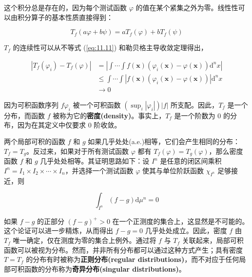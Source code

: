 这个积分总是存在的，因为每个测试函数 $\varphi$
的值在某个紧集之外为零。线性性可以由积分算子的基本性质直接得到：

$$
T_f(a \varphi + b \psi) = a T_f(\varphi) + b T_f(\psi)
$$

$T_f$ 的连续性可以从不等式 (\ref{eq:11.11}) 和勒贝格主导收敛定理得出，

$$
\begin{aligned}
\left|T_f(\varphi_i) - T_f(\varphi)\right| &= \left|\int \cdots \int f(\mathbf{x})\left(\varphi_i(\mathbf{x}) - \varphi(\mathbf{x})\right) \mathrm{d}^n x\right| \\
&\leq \int \cdots \int \left|f(\mathbf{x})\left(\varphi_i(\mathbf{x}) - \varphi(\mathbf{x})\right)\right| \mathrm{d}^n x \\
&\to 0
\end{aligned}
$$

因为可积函数序列 $f \varphi_i$ 被一个可积函数
$\left(\sup_i |\varphi_i|\right)|f|$ 所支配。因此，$T_f$
是一个分布，而函数 $f$
被称为它的\textbf{密度(density)}。事实上，$T_f$ 是一个阶数为 0
的分布，因为在其定义中仅要求 0 阶收敛。

两个局部可积的函数 $f$ 和 $g$
如果几乎处处(a.e.)相等，它们会产生相同的分布：$T_f = T_g$。反过来，如果对于所有测试函数
$\varphi$ 都有 $T_f(\varphi) = T_g(\varphi)$，那么密度函数 $f$ 和
$g$ 几乎处处相等。其证明思路如下：设 $I^n$ 是任意的闭区间乘积
$I^n = I_1 \times I_2 \times \cdots \times I_n$，并选择一个测试函数
$\varphi$ 使其与单位阶跃函数 $\chi_{I^n}$ 足够接近，则

$$
\int_{I^n}(f - g) \mathrm{d}\mu^n = 0
$$

如果 $f - g$ 的正部分 $(f - g)^+ > 0$
在一个正测度的集合上，这显然是不可能的。这个论证可以进一步精炼，从而得出
$f - g = 0$ 几乎处处成立。因此，密度 $f$ 由 $T_f$
唯一确定，仅在测度为零的集合上例外。通过将 $f$ 与 $T_f$
关联起来，局部可积函数可以被视为分布。然而，并非所有分布都可以通过这种方式产生；具有密度
$T = T_f$ 的分布有时被称为\textbf{正则分布(regular distributions)}，而不对应于任何局部可积函数的分布称为\textbf{奇异分布(singular distributions)}。

